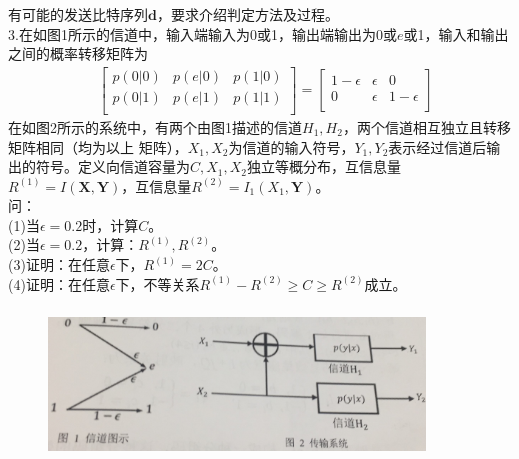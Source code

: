 \documentclass[UTF8]{ctexart}
\begin{document}
有可能的发送比特序列$\bm{d}$，要求介绍判定方法及过程。\\
3.在如图1所示的信道中，输入端输入为0或1，输出端输出为0或$e$或1，输入和输出之间的概率转移矩阵为
\begin{equation*}
  \begin{aligned}
     & \begin{bmatrix}
      p(0\lvert0) & p(e\lvert0) & p(1\lvert0) \\
      p(0\lvert1) & p(e\lvert1) & p(1\lvert1) \\
    \end{bmatrix}=
    \begin{bmatrix}
      1-\epsilon & \epsilon & 0          \\
      0          & \epsilon & 1-\epsilon \\
    \end{bmatrix}
  \end{aligned}
\end{equation*}
在如图2所示的系统中，有两个由图1描述的信道$H_1,H_2$，两个信道相互独立且转移矩阵相同（均为以上
矩阵），$X_1,X_2$为信道的输入符号，$Y_1,Y_2$表示经过信道后输出的符号。定义向信道容量为$C,X_1,
  X_2$独立等概分布，互信息量$R^{(1)}=I(\bm{X},\bm{Y})$，互信息量$R^{(2)}=I_1(X_1,\bm{Y})$。
\\问：\\
(1)当$\epsilon=0.2$时，计算$C$。\\
(2)当$\epsilon=0.2$，计算：$R^{(1)},R^{(2)}$。\\
(3)证明：在任意$\epsilon$下，$R^{(1)}=2C$。\\
(4)证明：在任意$\epsilon$下，不等关系$R^{(1)}-R^{(2)}\geq C\geq R^{(2)}$成立。\\
\begin{figure}[H]
  \centering
  \includegraphics[width=10cm,height=4cm]{2_3.jpg}
\end{figure}
\end{document}
